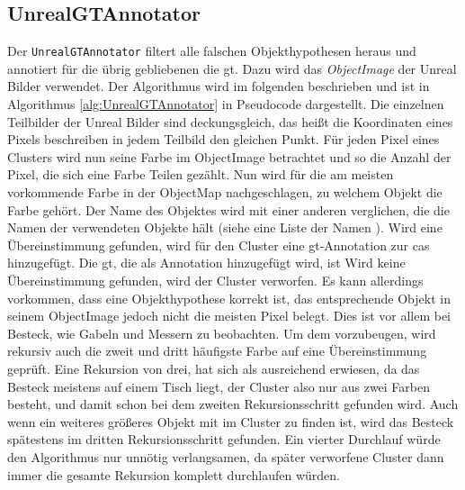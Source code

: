 \subsection{UnrealGTAnnotator}
Der \texttt{UnrealGTAnnotator} filtert alle falschen Objekthypothesen heraus und annotiert für die übrig gebliebenen die \gls{gt}. Dazu wird das \textit{ObjectImage} der Unreal Bilder verwendet. Der Algorithmus wird im folgenden beschrieben und ist in Algorithmus \ref{alg:UnrealGTAnnotator} in Pseudocode dargestellt. Die einzelnen Teilbilder der Unreal Bilder sind deckungsgleich, das heißt die Koordinaten eines Pixels beschreiben in jedem Teilbild den gleichen Punkt. Für jeden Pixel eines Clusters wird nun seine Farbe im ObjectImage betrachtet und so die Anzahl der Pixel, die sich eine Farbe Teilen gezählt. Nun wird für die am meisten vorkommende Farbe in der ObjectMap nachgeschlagen, zu welchem Objekt die Farbe gehört. Der Name des Objektes wird mit einer anderen  verglichen, die die Namen der verwendeten Objekte hält (siehe eine Liste der Namen ). Wird eine Übereinstimmung gefunden, wird für den Cluster eine \gls{gt}-Annotation zur \gls{cas} hinzugefügt. Die \gls{gt}, die als Annotation hinzugefügt wird, ist  Wird keine Übereinstimmung gefunden, wird der Cluster verworfen. Es kann allerdings vorkommen, dass eine Objekthypothese korrekt ist, das entsprechende Objekt in seinem ObjectImage jedoch nicht die meisten Pixel belegt. Dies ist vor allem bei Besteck, wie Gabeln und Messern zu beobachten. Um dem vorzubeugen, wird rekursiv auch die zweit und dritt häufigste Farbe auf eine Übereinstimmung geprüft. Eine Rekursion von drei, hat sich als ausreichend erwiesen, da das Besteck meistens auf einem Tisch liegt, der Cluster also nur aus zwei Farben besteht, und damit schon bei dem zweiten Rekursionsschritt gefunden wird. Auch wenn ein weiteres größeres Objekt mit im Cluster zu finden ist, wird das Besteck spätestens im dritten Rekursionsschritt gefunden. Ein vierter Durchlauf würde den Algorithmus nur unnötig verlangsamen, da später verworfene Cluster dann immer die gesamte Rekursion komplett durchlaufen würden. 


